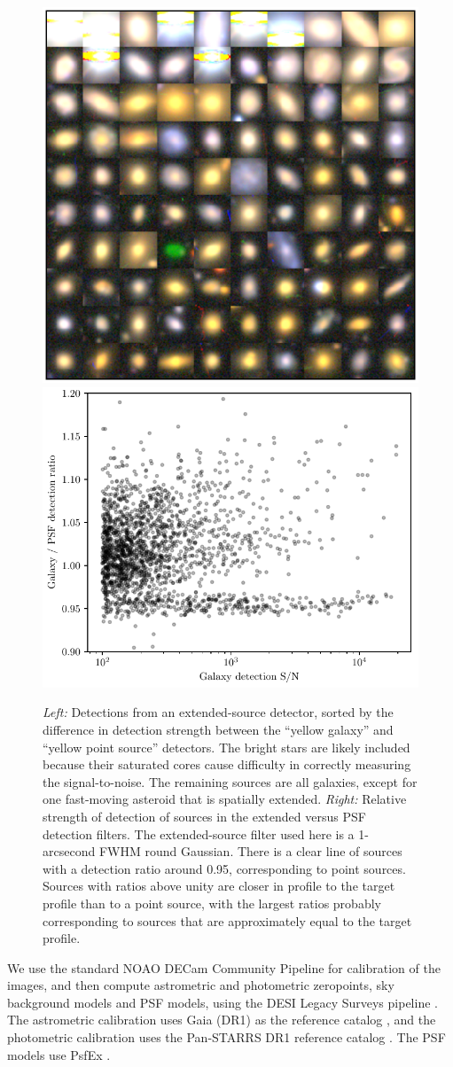 \documentclass[letterpaper,preprint]{aastex62}
\begin{document}
\begin{figure}
  \begin{center}
    \includegraphics[height=0.4\textwidth]{galaxies}
    \includegraphics[height=0.4\textwidth]{galaxies-relsn}
    \caption{\emph{Left:} Detections from an extended-source detector,
      sorted by the difference in detection strength between the
      ``yellow galaxy'' and ``yellow point source'' detectors.  The
      bright stars are likely included because their saturated cores
      cause difficulty in correctly measuring the signal-to-noise.
      The remaining sources are all galaxies, except for one
      fast-moving asteroid that is spatially extended.  \emph{Right:}
      Relative strength of detection of sources in the extended versus
      PSF detection filters.  The extended-source filter used here is
      a 1-arcsecond FWHM round Gaussian.  There is a clear line of
      sources with a detection ratio around 0.95, corresponding to
      point sources.  Sources with ratios above unity are closer in
      profile to the target profile than to a point source, with the
      largest ratios probably corresponding to sources that are
      approximately equal to the target profile.
      \label{fig:gals}}
  \end{center}
\end{figure}

We use the standard NOAO DECam Community Pipeline \citep{cppipeline}
for calibration of the images, and then compute astrometric and
photometric zeropoints, sky background models and PSF models, using
the DESI Legacy Surveys pipeline \citep{lsoverview}.  The astrometric
calibration uses Gaia (DR1) as the reference catalog \citep{gaia,
  gaiaDR1}, and the photometric calibration uses the Pan-STARRS DR1
reference catalog \citep{panstarrs}.  The PSF models use PsfEx
\citep{psfex}.
\end{document}
